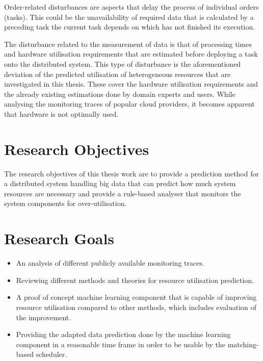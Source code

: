         Order-related disturbances are aspects that delay the process of individual orders (tasks).
        This could be the unavailability of required data that is calculated by a preceding task the current task depends on which has not finished its execution. 

        The disturbance related to the measurement of data is that of processing times and hardware utilisation requirements that are estimated before deploying a task onto the distributed system. 
        This type of disturbance is the aforementioned deviation of the predicted utilisation of heterogeneous resources that are investigated in this thesis. These cover the hardware utilisation requirements and the already existing estimations done by domain experts and users. While analysing the monitoring traces of popular cloud providers, it becomes apparent that hardware is not optimally used.


        
        \section{Research Objectives}
        \label{sec:research-objectives-introduction}

            The research objectives of this thesis work are to provide a prediction method for a distributed system handling big data that can predict how much system resources are necessary and provide a rule-based analyser that monitors the system components for over-utilisation.

        \section{Research Goals}
        \label{sec:goals-results-introduction}

            \begin{itemize}
                \item An analysis of different publicly available monitoring traces.
                \item Reviewing different methods and theories for resource utilisation prediction.
                \item A proof of concept machine learning component that is capable of improving resource utilisation compared to other methods, which includes evaluation of the improvement.
                \item Providing the adapted data prediction done by the machine learning component in a reasonable time frame in order to be usable by the matching-based scheduler.
                
            \end{itemize}
            
